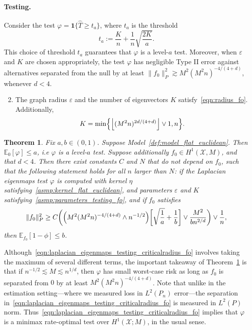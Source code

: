 \documentclass{article}
\newcommand{\floor}[1]{\left\lfloor #1 \right\rfloor}
\newcommand{\1}{\mathbf{1}}
\newcommand{\mc}[1]{\mathcal{#1}}
\newcommand{\Ebb}{\mathbb{E}}
\newcommand{\wh}[1]{\widehat{#1}}
\theoremstyle{alden}
\theoremstyle{aldenthm}
\newtheorem{theorem}{Theorem}
\theoremstyle{definition}
\theoremstyle{remark}
\begin{document}
\paragraph{Testing.} Consider the test $\varphi = \1\{\wh{T} \geq t_{a}\}$, where $t_{a}$ is the threshold
\begin{equation*}
t_{a} := \frac{K}{n} + \frac{1}{n}\sqrt{\frac{2K}{a}}.
\end{equation*}
This choice of threshold $t_{a}$ guarantees that $\varphi$ is a level-$a$ test. Moreover, when $\varepsilon$ and $K$ are chosen appropriately, the test $\varphi$ has negligible Type II error against alternatives separated from the null by at least $\|f_0\|_{P}^2 \gtrsim M^2(M^2n)^{-4/(4 + d)}$, whenever $d < 4$. 

\begin{enumerate}[label=(P\arabic*)]
	\setcounter{enumi}{1}
	\item 
	\label{asmp:parameters_testing_fo}
	The graph radius $\varepsilon$ and the number of eigenvectors $K$ satisfy~\eqref{eqn:radius_fo}. Additionally,
	\begin{equation}
	\label{eqn:eigenvector_testing_fo}
	K = \min\Bigl\{\floor{(M^2n)^{2d/(4 + d)}} \vee 1, n\Bigr\}.
	\end{equation}
\end{enumerate}
\begin{theorem}
	\label{thm:laplacian_eigenmaps_testing_fo}
	Fix $a,b \in (0,1)$. Suppose Model~\ref{def:model_flat_euclidean}. Then $\mathbb{E}_0[\varphi] \leq a$, i.e $\varphi$ is a level-$a$ test. Suppose additionally $f_0 \in H^1(\mc{X},M)$, and that $d < 4$. Then there exist constants $C$ and $N$ that do not depend on $f_0$, such that the following statement holds for all $n$ larger than $N$: if the Laplacian eigenmaps test $\varphi$ is computed with kernel $\eta$ satisfying~\ref{asmp:kernel_flat_euclidean}, and parameters $\varepsilon$ and $K$ satisfying~\ref{asmp:parameters_testing_fo}, and if $f_0$ satisfies
	\begin{equation}
	\label{eqn:laplacian_eigenmaps_testing_criticalradius_fo}
	\|f_0\|_P^2 \geq C\biggl(\Bigl(M^2(M^2n)^{-4/(4 + d) } \wedge n^{-1/2}\Bigr)\biggl[\sqrt{\frac{1}{a}} + \frac{1}{b}\biggr] \vee \frac{M^2}{b n^{2/d}} \biggr) \vee \frac{1}{n},
	\end{equation}
	then $\Ebb_{f_0}[1 - \phi] \leq b$.
\end{theorem}
Although~\eqref{eqn:laplacian_eigenmaps_testing_criticalradius_fo} involves taking the maximum of several different terms, the important takeaway of Theorem~\ref{thm:laplacian_eigenmaps_testing_fo} is that if $n^{-1/2} \lesssim M \lesssim n^{1/d}$, then $\varphi$ has small worst-case risk as long as $f_0$ is separated from $0$ by at least $M^2(M^2n)^{-4/(4 + d)}$. Note that unlike in the estimation setting---where we measured loss in $L^2(P_n)$ error---the separation in~\eqref{eqn:laplacian_eigenmaps_testing_criticalradius_fo} is measured in $L^2(P)$ norm. Thus~\eqref{eqn:laplacian_eigenmaps_testing_criticalradius_fo} implies that $\varphi$ is a minimax rate-optimal test over $H^1(\mc{X};M)$, in the usual sense.
\end{document}
